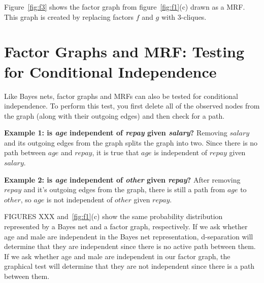 \documentclass[twoside]{article}
\begin{document}
Figure~\ref{fig:f3} shows the factor graph from figure~\ref{fig:f1}(c) drawn as a MRF.
This graph is created by replacing factors $f$ and $g$ with 3-cliques.

\section{Factor Graphs and MRF: Testing for Conditional Independence}
Like Bayes nets, factor graphs and MRFs can also be tested for conditional independence.
To perform this test, you first delete all of the observed nodes from the graph 
(along with their outgoing edges) and then check for a path. 
\begin{figure}[h]
\caption{}
\label{fig:f2}
\centering
{}
\hfill
{}
\end{figure}

\textbf{Example 1: is \textit{age} independent of \textit{repay} given \textit{salary}?}
Removing $salary$ and its outgoing edges from the graph splits the graph into two.
Since there is no path between $age$ and $repay$, it is true that $age$ is independent of $repay$ given $salary$.

\textbf{Example 2: is \textit{age} independent of \textit{other} given \textit{repay}?}
After removing $repay$ and it's outgoing edges from the graph, there is still a path from $age$ to $other$,
so $age$ is not independent of $other$ given $repay$.

FIGURES XXX and~\ref{fig:f1}(c) show the same probability distribution represented by a Bayes net and a factor graph, respectively.
If we ask whether age and male are independent in the Bayes net representation,
d-separation will determine that they are independent since there is no active path between them. If we ask whether age and
male are independent in our factor graph, the graphical test will determine that they are not independent
since there is a path between them.
\end{document}
